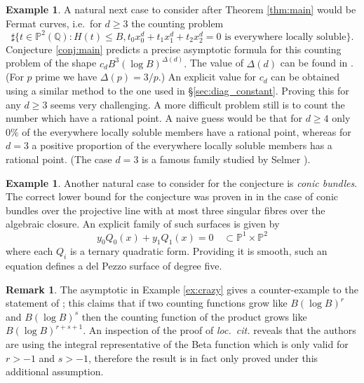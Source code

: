 \documentclass[a4paper,12pt,reqno]{amsart}
\numberwithin{equation}{section} \numberwithin{figure}{section}
\renewcommand\P{\mathbb{P}}
\newcommand\Q{\mathbb{Q}}
\renewcommand{\leq}{\leqslant}
\renewcommand{\geq}{\geqslant}
\renewcommand{\#}{\sharp}
\theoremstyle{definition}
\newtheorem{example}[lemma]{Example}
\newtheorem{remark}[lemma]{Remark}
\numberwithin{lemma}{section}
\begin{document}
 

\begin{example}
	A natural next case to consider after Theorem \ref{thm:main} would be Fermat curves,
	i.e.~for $d \geq 3$ the counting problem
	$$\#\{ t \in \P^2(\Q): H(t) \leq B, t_0x_0^d + t_1x_1^d + t_2x_2^d = 0
	\text{ is everywhere locally soluble}\}.$$
	Conjecture \ref{conj:main} predicts a precise asymptotic formula for this
	counting problem of the shape
	$c_d B^3 (\log B)^{\Delta(d)}.$ 
	The value of $\Delta(d)$ can be found in \cite[\S 5.4]{LS16}.
	(For $p$ prime we have $\Delta(p) = 3/p$.) An explicit value for $c_d$
	can be obtained using a similar method to the one used in \S \ref{sec:diag_constant}.
	Proving this for any $d \geq 3$ seems very challenging. A more difficult problem
	still is to count the number which have a rational point. A naive guess would be that
	for $d \geq 4$ only $0\%$ of the everywhere locally soluble members have a rational
	point, whereas for $d = 3$ a positive proportion of the everywhere locally soluble
	members has a rational point. (The case $d=3$ is a famous family studied by 
	Selmer \cite{Sel51}).
\end{example}

\begin{example}
	Another natural case to consider for the conjecture is \emph{conic bundles}.
	The correct lower bound for the conjecture was proven in \cite{Sof16} in the 
	case of conic bundles over the projective line with at most three singular fibres
	over the algebraic closure. An explicit family of such surfaces is given by
	$$y_0 Q_0(x) + y_1Q_1(x) = 0 \quad \subset \P^1 \times \P^2$$
	where each $Q_i$ is a ternary quadratic form. Providing it is smooth,
	such an equation defines a del Pezzo surface of degree five.
\end{example}

\begin{remark}
The asymptotic in Example \ref{ex:crazy} gives a counter-example to the statement of \cite[Prop. 2]{FMT89}; this claims that if two counting functions grow like $B(\log B)^r$ and $B(\log B)^s$ then the counting function of the product grows like $B(\log B)^{r + s + 1}$. An inspection of the proof of \emph{loc.~cit.} reveals that the authors are using the integral representative of the Beta function which is only valid for $r> -1$ and $s> -1$, therefore the result is in fact only proved under this additional assumption.
\end{remark}
\end{document}
